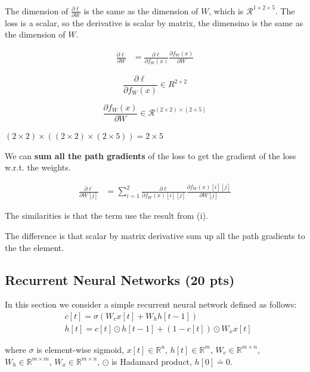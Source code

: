 \begin{enumerate}[(a)]
The dimension of $\frac{\partial \ell}{\partial W}$ is the same as the dimension of $W$, which is $\mathcal{R} ^ {1 \times 2 \times 5}$. The loss is a scalar, so the derivative is scalar by matrix, the dimensino is the same as the dimension of $W$.


\begin{align}
    \frac{\partial \ell}{\partial W} 
    &=\frac{\partial \ell}{\partial f_W(x)} \frac{\partial f_W(x)}{\partial W} 
\end{align}

$$\frac{\partial \ell}{\partial f_W(x)} \in R^{2\times2} $$

$$\frac {\partial f_W(x)}{\partial W} \in \mathcal{R} ^ {(2 \times 2) \times (2 \times 5)}$$

$(2 \times 2) \times ((2 \times 2) \times (2 \times 5)) = 2 \times 5 $

We can \textbf{sum all the path gradients} of the loss to get the gradient of the loss w.r.t. the weights.

\begin{align}
    \frac{\partial \ell}{\partial W[j]} 
    &=\sum_{i=1}^{2} \frac{\partial \ell}{\partial f_W(x)[i][j]} \frac{\partial f_W(x)[i][j]}{\partial W[j]}
\end{align}


The similarities is that the term use the result from (i).



The difference is that scalar by matrix derivative sum up all the path gradients to the the element.



\end{enumerate}

\subsection{Recurrent Neural Networks (20 pts) }

In this section we consider a simple recurrent neural network defined as follows:
\begin{align}
&c[t] = \sigma(W_c x[t] + W_h h[t - 1]) \\
&h[t] = c[t] \odot h[{t-1}] + (1-c[t]) \odot W_x x[t]
\end{align}

where $\sigma$ is element-wise sigmoid, $x[t] \in \mathbb{R}^n$, $h[t] \in \mathbb{R}^m$, $W_c \in \mathbb{R}^{m \times n}$,  $W_h \in \mathbb{R}^{m \times m}$, $W_x \in \mathbb{R}^{m \times n}$, $\odot$ is Hadamard product, $h[0] \doteq 0$.

